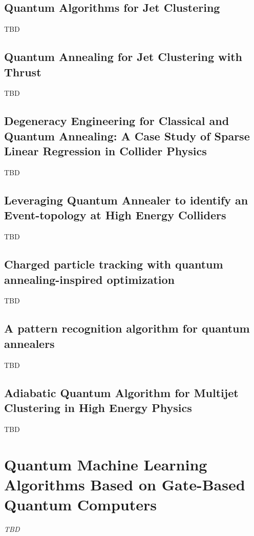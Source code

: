 \subsection{Quantum Algorithms for Jet Clustering~\cite{Wei:2019rqy}}
TBD
\subsection{Quantum Annealing for Jet Clustering with Thrust~\cite{Delgado:2022snu}}
TBD
\subsection{Degeneracy Engineering for Classical and Quantum Annealing: A Case Study of Sparse Linear Regression in Collider Physics~\cite{Anschuetz:2022rwu}}
TBD
\subsection{Leveraging Quantum Annealer to identify an Event-topology at High Energy Colliders~\cite{Kim:2021wrr}}
TBD
\subsection{Charged particle tracking with quantum annealing-inspired optimization~\cite{Zlokapa:2019tkn}}
TBD
\subsection{A pattern recognition algorithm for quantum annealers~\cite{Bapst:2019llh}}
TBD
\subsection{Adiabatic Quantum Algorithm for Multijet Clustering in High Energy Physics~\cite{Pires:2020urc}}
TBD


\section{Quantum Machine Learning Algorithms Based on Gate-Based Quantum Computers}

\textit{TBD}

